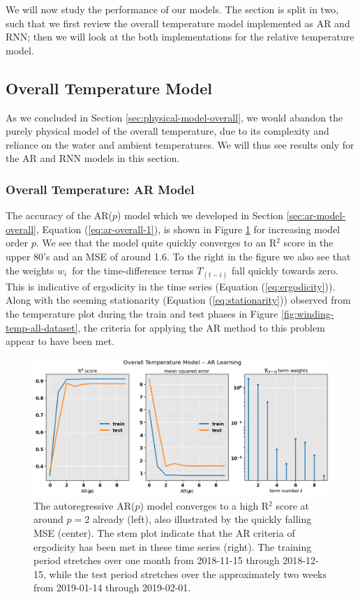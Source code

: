 \documentclass[]{article}
\begin{document}

We will now study the performance of our models. The section is split in two, such that we first review the overall temperature model implemented as AR and RNN; then we will look at the both implementations for the relative temperature model.

\subsection{Overall Temperature Model} \label{sec:results-overall}
As we concluded in Section \ref{sec:physical-model-overall}, we would abandon the purely physical model of the overall temperature, due to its complexity and reliance on the water and ambient temperatures. We will thus see results only for the AR and RNN models in this section.

\subsubsection{Overall Temperature: AR Model} \label{sec:results-overall-ar}
The accuracy of the AR($p$) model which we developed in Section \ref{sec:ar-model-overall}, Equation (\ref{eq:ar-overall-1}), is shown in Figure \ref{fig:ar-model-learning} for increasing model order $p$. We see that the model quite quickly converges to an R$^2$ score in the upper 80's and an MSE of around 1.6. To the right in the figure we also see that the weights $w_i$ for the time-difference terms $T_{(t-i)}$ fall quickly towards zero. This is indicative of ergodicity in the time series (Equation (\ref{eq:ergodicity})). Along with the seeming stationarity (Equation (\ref{eq:stationarity})) observed from the temperature plot during the train and test phases in Figure \ref{fig:winding-temp-all-dataset}, the criteria for applying the AR method to this problem appear to have been met. 

\begin{figure}[!h]
	\centering
	\includegraphics[width=1\linewidth]{./figs/ar-model-learning.png}
	\caption{The autoregressive AR($p$) model converges to a high R$^2$ score at around $p = 2$ already (left), also illustrated by the quickly falling MSE (center). The stem plot indicate that the AR criteria of ergodicity has been met in these time series (right). The training period stretches over one month from 2018-11-15 through 2018-12-15, while the test period stretches over the approximately two weeks from 2019-01-14 through 2019-02-01.}
	\label{fig:ar-model-learning}
\end{figure}
\end{document}
